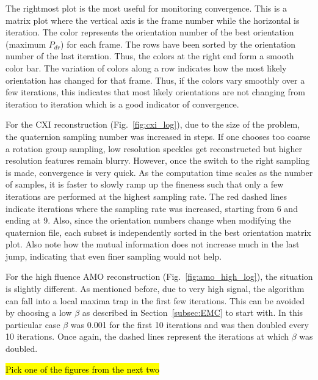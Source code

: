 \documentclass[]{iucr}              %
\begin{document}
The rightmost plot is the most useful for monitoring convergence. This is a matrix plot where the vertical axis is the frame number while the horizontal is iteration. The color represents the orientation number of the best orientation (maximum $P_{dr}$) for each frame. The rows have been sorted by the orientation number of the last iteration. Thus, the colors at the right end form a smooth color bar. The variation of colors along a row indicates how the most likely orientation has changed for that frame. Thus, if the colors vary smoothly over a few iterations, this indicates that most likely orientations are not changing from iteration to iteration which is a good indicator of convergence.

For the CXI reconstruction (Fig.~\ref{fig:cxi_log}), due to the size of the problem, the quaternion sampling number was increased in steps. If one chooses too coarse a rotation group sampling, low resolution speckles get reconstructed but higher resolution features remain blurry. However, once the switch to the right sampling is made, convergence is very quick. As the computation time scales as the number of samples, it is faster to slowly ramp up the fineness such that only a few iterations are performed at the highest sampling rate. The red dashed lines indicate iterations where the sampling rate was increased, starting from 6 and ending at 9. Also, since the orientation numbers change when modifying the quaternion file, each subset is independently sorted in the best orientation matrix plot. Also note how the mutual information does not increase much in the last jump, indicating that even finer sampling would not help.

For the high fluence AMO reconstruction (Fig.~\ref{fig:amo_high_log}), the situation is slightly different. As mentioned before, due to very high signal, the algorithm can fall into a local maxima trap in the first few iterations. This can be avoided by choosing a low $\beta$ as described in Section~\ref{subsec:EMC} to start with. In this particular case $\beta$ was 0.001 for the first 10 iterations and was then doubled every 10 iterations. Once again, the dashed lines represent the iterations at which $\beta$ was doubled.

\hl{Pick one of the figures from the next two}
\end{document}
